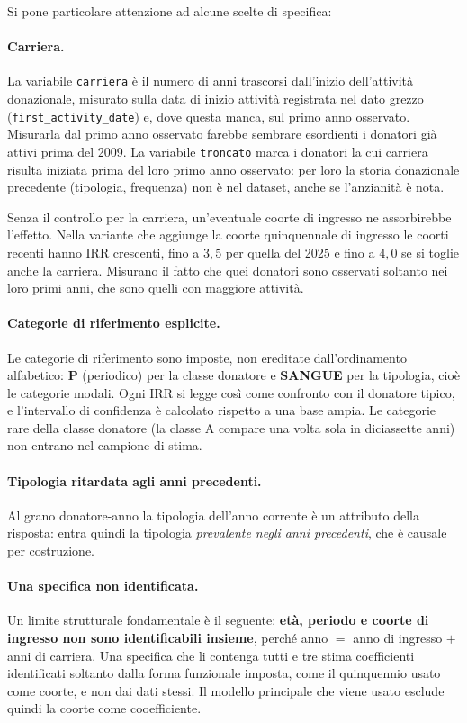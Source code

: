 Si pone particolare attenzione ad alcune scelte di specifica:

\paragraph{Carriera.}
La variabile \texttt{carriera} è il numero di anni trascorsi dall'inizio
dell'attività donazionale, misurato sulla data di inizio attività registrata
nel dato grezzo (\texttt{first\_activity\_date}) e, dove questa manca, sul primo
anno osservato. Misurarla dal primo anno osservato farebbe sembrare esordienti
i donatori già attivi prima del 2009. La variabile \texttt{troncato} marca i
donatori la cui carriera risulta iniziata prima del loro primo anno osservato:
per loro la storia donazionale precedente (tipologia, frequenza) non è nel
dataset, anche se l'anzianità è nota.

Senza il controllo per la carriera, un'eventuale coorte di ingresso ne
assorbirebbe l'effetto. Nella variante che aggiunge la coorte quinquennale di
ingresso le coorti recenti hanno IRR crescenti, fino a $3{,}5$ per quella del
2025 e fino a $4{,}0$
se si toglie anche la carriera. Misurano il fatto che quei donatori sono osservati soltanto nei loro primi
anni, che sono quelli con maggiore attività.

\paragraph{Categorie di riferimento esplicite.}
Le categorie di riferimento sono imposte, non ereditate dall'ordinamento
alfabetico: \textbf{P} (periodico) per la classe donatore e \textbf{SANGUE} per
la tipologia, cioè le categorie modali. Ogni IRR si legge così come confronto
con il donatore tipico, e l'intervallo di confidenza è calcolato rispetto a una
base ampia. Le categorie rare della classe donatore (la classe A compare una
volta sola in diciassette anni) non entrano nel campione di stima.

\paragraph{Tipologia ritardata agli anni precedenti.}
Al grano donatore-anno la tipologia dell'anno corrente è un attributo della
risposta: entra quindi la tipologia \emph{prevalente negli anni
precedenti}, che è causale per costruzione.

\paragraph{Una specifica non identificata.}
Un limite strutturale fondamentale è il seguente:
\textbf{età, periodo e coorte di ingresso non sono identificabili insieme}, 
perché anno $=$ anno di ingresso $+$ anni di carriera. Una specifica
che li contenga tutti e tre stima coefficienti identificati soltanto dalla
forma funzionale imposta, come il quinquennio usato come coorte, e non dai dati
stessi. Il modello principale che viene usato
esclude quindi la coorte come cooefficiente.

